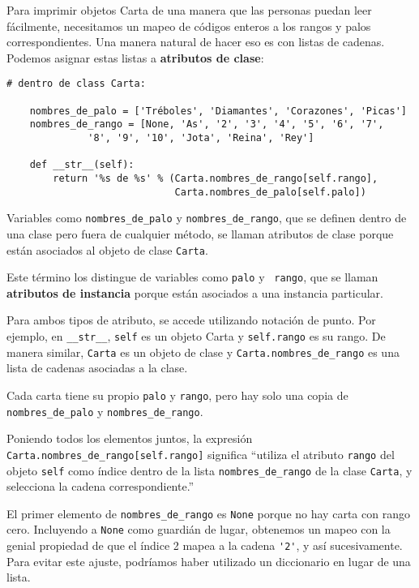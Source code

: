 \documentclass[10pt]{book}
\begin{document}
Para imprimir objetos Carta de una manera que las personas puedan leer
fácilmente, necesitamos un mapeo de códigos enteros a los rangos y palos
correspondientes.  Una manera natural de
hacer eso es con listas de cadenas.  Podemos asignar estas listas a {\bf atributos
de clase}:

\begin{verbatim}
# dentro de class Carta:

    nombres_de_palo = ['Tréboles', 'Diamantes', 'Corazones', 'Picas']
    nombres_de_rango = [None, 'As', '2', '3', '4', '5', '6', '7',
              '8', '9', '10', 'Jota', 'Reina', 'Rey']

    def __str__(self):
        return '%s de %s' % (Carta.nombres_de_rango[self.rango],
                             Carta.nombres_de_palo[self.palo])
\end{verbatim}
%
Variables como \verb"nombres_de_palo" y \verb"nombres_de_rango", que se
definen dentro de una clase pero fuera de cualquier método, se llaman
atributos de clase porque están asociados al objeto de clase
{\tt Carta}.

Este término los distingue de variables como {\tt palo} y {\tt
  rango}, que se llaman {\bf atributos de instancia} porque están
asociados a una instancia particular.

Para ambos tipos de atributo, se accede utilizando notación de punto.  Por
ejemplo, en \verb"__str__", {\tt self} es un objeto Carta
y {\tt self.rango} es su rango.  De manera similar, {\tt Carta}
es un objeto de clase y \verb"Carta.nombres_de_rango" es una
lista de cadenas asociadas a la clase.

Cada carta tiene su propio {\tt palo} y {\tt rango}, pero hay
solo una copia de \verb"nombres_de_palo" y \verb"nombres_de_rango".

Poniendo todos los elementos juntos, la expresión
\verb"Carta.nombres_de_rango[self.rango]" significa ``utiliza el atributo {\tt rango}
del objeto {\tt self} como índice dentro de la lista \verb"nombres_de_rango"
de la clase {\tt Carta}, y selecciona la cadena correspondiente.''

El primer elemento de \verb"nombres_de_rango" es {\tt None} porque no
hay carta con rango cero.  Incluyendo a {\tt None} como guardián de lugar,
obtenemos un mapeo con la genial propiedad de que el índice 2 mapea a la
cadena \verb"'2'", y así sucesivamente.  Para evitar este ajuste, podríamos haber
utilizado un diccionario en lugar de una lista.
\end{document}
